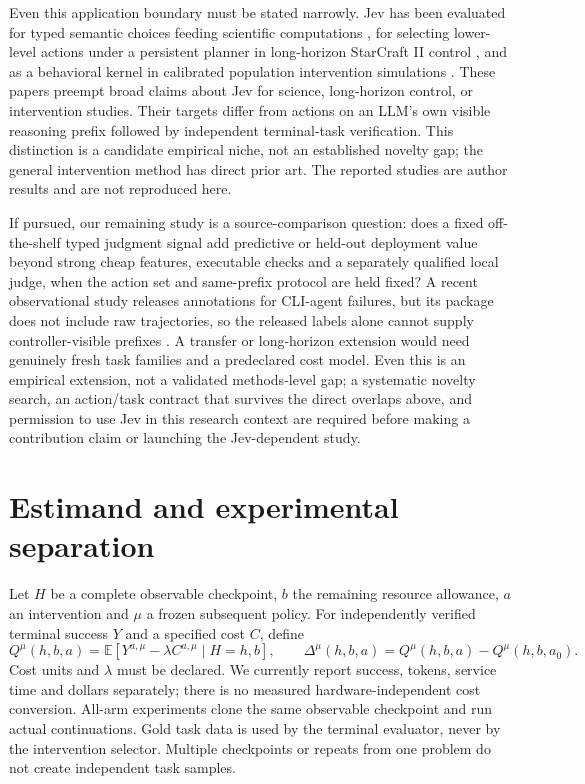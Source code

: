 \documentclass[11pt]{article}
\begin{document}
Even this application boundary must be stated narrowly. Jev has been evaluated for typed semantic choices feeding scientific computations \cite{jevscience}, for selecting lower-level actions under a persistent planner in long-horizon StarCraft II control \cite{jevstar}, and as a behavioral kernel in calibrated population intervention simulations \cite{kite}. These papers preempt broad claims about Jev for science, long-horizon control, or intervention studies. Their targets differ from actions on an LLM's own visible reasoning prefix followed by independent terminal-task verification. This distinction is a candidate empirical niche, not an established novelty gap; the general intervention method has direct prior art. The reported studies are author results and are not reproduced here.

If pursued, our remaining study is a source-comparison question: does a fixed off-the-shelf typed judgment signal add predictive or held-out deployment value beyond strong cheap features, executable checks and a separately qualified local judge, when the action set and same-prefix protocol are held fixed? A recent observational study releases annotations for CLI-agent failures, but its package does not include raw trajectories, so the released labels alone cannot supply controller-visible prefixes \cite{failureprocess}. A transfer or long-horizon extension would need genuinely fresh task families and a predeclared cost model. Even this is an empirical extension, not a validated methods-level gap; a systematic novelty search, an action/task contract that survives the direct overlaps above, and permission to use Jev in this research context are required before making a contribution claim or launching the Jev-dependent study.

\section{Estimand and experimental separation}
Let $H$ be a complete observable checkpoint, $b$ the remaining resource allowance, $a$ an intervention and $\mu$ a frozen subsequent policy. For independently verified terminal success $Y$ and a specified cost $C$, define
\[
Q^\mu(h,b,a)=\mathbb E[Y^{a,\mu}-\lambda C^{a,\mu}\mid H=h,b],\qquad
\Delta^\mu(h,b,a)=Q^\mu(h,b,a)-Q^\mu(h,b,a_0).
\]
Cost units and $\lambda$ must be declared. We currently report success, tokens, service time and dollars separately; there is no measured hardware-independent cost conversion. All-arm experiments clone the same observable checkpoint and run actual continuations. Gold task data is used by the terminal evaluator, never by the intervention selector. Multiple checkpoints or repeats from one problem do not create independent task samples.
\end{document}
